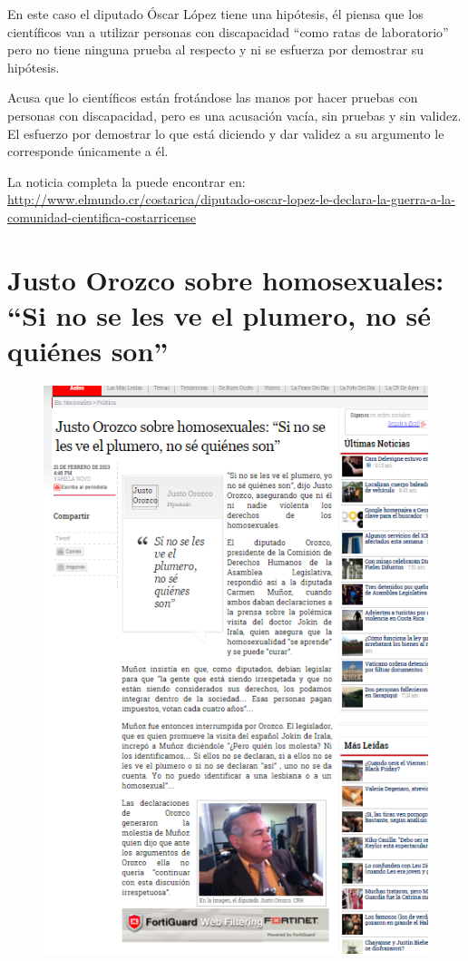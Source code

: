 \documentclass[times]{simauth}
\begin{document}
En este caso el diputado Óscar López tiene una hipótesis, él piensa que los  científicos van a utilizar personas con discapacidad ``como ratas de laboratorio'' pero no tiene ninguna prueba al respecto y ni se esfuerza por demostrar su hipótesis. 

Acusa que lo científicos están frotándose las manos por hacer pruebas con personas con discapacidad, pero es una acusación vacía, sin pruebas y sin validez. El esfuerzo por demostrar lo que está diciendo y dar validez a su argumento le corresponde únicamente a él.   

La noticia completa la puede encontrar en: \href{http://www.elmundo.cr/costarica/diputado-oscar-lopez-le-declara-la-guerra-a-la-comunidad-cientifica-costarricense/}{http://www.elmundo.cr/costarica/diputado-oscar-lopez-le-declara-la-guerra-a-la-comunidad-cientifica-costarricense}

\newpage
\section{Justo Orozco sobre homosexuales: ``Si no se les ve el plumero, no sé quiénes son''}

\begin{figure}[h!]
    \centering
    \includegraphics[width=14cm]{justo}
    \label{fig:falacia12}
\end{figure}
\end{document}
